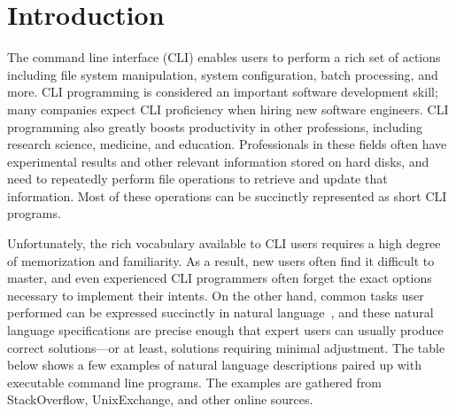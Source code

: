 \section{Introduction}


The command line interface (CLI) enables users to perform a rich set of actions including file system manipulation, system configuration, batch processing, and more. CLI programming is considered an important software development skill; many companies expect CLI proficiency when hiring new software engineers. CLI programming also greatly boosts productivity in other professions, including research science, medicine, and education. Professionals in these fields often have experimental results and other relevant information stored on hard disks, and need to repeatedly perform file operations to retrieve and update that information. Most of these operations can be succinctly represented as short CLI programs.

Unfortunately, the rich vocabulary available to CLI users requires a high degree of memorization and familiarity. As a result, new users often find it difficult to master, and even experienced CLI programmers often forget the exact options necessary to implement their intents. On the other hand, common tasks user performed can be expressed  succinctly in natural language~\cite{Myers:2004:NPL:1015864.1015888}, and
these natural language specifications are precise enough that expert users can
usually produce correct solutions---or at least, solutions requiring minimal
adjustment. The table below shows a few examples of natural language
descriptions paired up with executable command line programs. The examples are gathered from
StackOverflow, UnixExchange, and other online sources.


